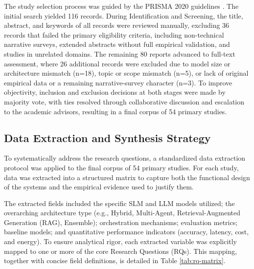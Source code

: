The study selection process was guided by the PRISMA 2020 guidelines \cite{page2021prisma}. The initial search yielded 116 records. During Identification and Screening, the title, abstract, and keywords of all records were reviewed manually, excluding 36 records that failed the primary eligibility criteria, including non-technical narrative surveys, extended abstracts without full empirical validation, and studies in unrelated domains. The remaining 80 reports advanced to full-text assessment, where 26 additional records were excluded due to model size or architecture mismatch (n=18), topic or scope mismatch (n=5), or lack of original empirical data or a remaining narrative-survey character (n=3). To improve objectivity, inclusion and exclusion decisions at both stages were made by majority vote, with ties resolved through collaborative discussion and escalation to the academic advisors, resulting in a final corpus of 54 primary studies.

\subsection{Data Extraction and Synthesis Strategy}
\label{sec:data_extraction}

To systematically address the research questions, a standardized data extraction protocol was applied to the final corpus of 54 primary studies. For each study, data was extracted into a structured matrix to capture both the functional design of the systems and the empirical evidence used to justify them. 

The extracted fields included the specific SLM and LLM models utilized; the overarching architecture type (e.g., Hybrid, Multi-Agent, Retrieval-Augmented Generation (RAG), Ensemble); orchestration mechanisms; evaluation metrics; baseline models; and quantitative performance indicators (accuracy, latency, cost, and energy). To ensure analytical rigor, each extracted variable was explicitly mapped to one or more of the core Research Questions (RQs). This mapping, together with concise field definitions, is detailed in Table \ref{tab:rq-matrix}.

